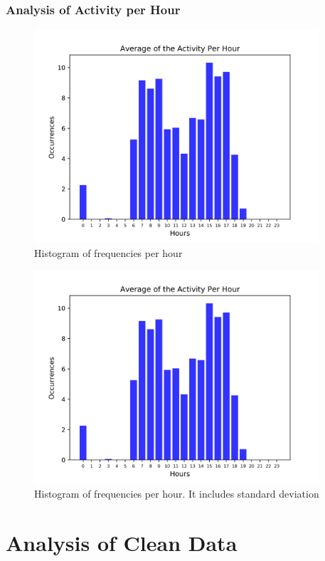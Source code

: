 \documentclass[11pt,fleqn]{book} %
\begin{document}
%
\subsection{Analysis of Activity per Hour}%
\label{subsec:Analysis of Activity per Hour}%


\begin{figure}[h!]%
\centering%
\includegraphics[width=400px]{Pictures/plots/good/Morelia Hive 1histogramUnclean.png}%
\caption{Histogram of frequencies per hour}%
\end{figure}

%


\begin{figure}[h!]%
\centering%
\includegraphics[width=400px]{Pictures/plots/good/Morelia Hive 1histogramUnclean.png}%
\caption{Histogram of frequencies per hour. It includes standard deviation}%
\end{figure}

\chapter{Analysis of Clean Data}
\normalsize%
\end{document}
